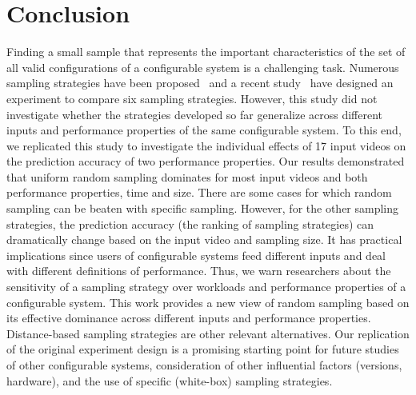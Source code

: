\section{Conclusion} \label{sec:conclusion}


Finding a small sample that represents the important characteristics of the set of all valid configurations of a configurable system is a challenging task.
Numerous sampling strategies have been proposed~\cite{julianasurvey} and a recent study~\cite{kaltenecker2019} have designed an experiment to compare six sampling strategies.
However, this study did not investigate whether the strategies developed so far generalize across different inputs and performance properties of the same configurable system. 
To this end, we replicated this study to investigate the individual effects of 17 input videos on the prediction accuracy of two performance properties.
Our results demonstrated that uniform random sampling dominates for most input videos and both performance properties, time and size. There are some cases for which random sampling can be beaten with specific sampling.
However, for the other sampling strategies, the prediction accuracy (\ie the ranking of sampling strategies) can dramatically change based on the input video and sampling size. It has practical implications since users of configurable systems feed different inputs and deal with different definitions of performance. Thus, we warn researchers about the sensitivity of a sampling strategy over workloads and performance properties of a configurable system.
 This work provides a new view of random sampling based on its effective dominance across different inputs and performance properties. Distance-based sampling strategies are other relevant alternatives.   
 Our replication of the original experiment design is a promising starting point for future studies of other configurable systems, consideration of other influential factors (versions, hardware), and the use of specific (\eg white-box) sampling strategies. 



